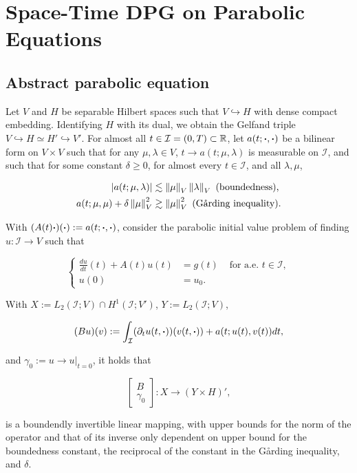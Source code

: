 \chapter{Space-Time DPG on Parabolic Equations}



\section{Abstract parabolic equation}

Let $V$ and $H$ be separable Hilbert spaces such that $V\hookrightarrow H$ with dense compact embedding. Identifying $H$ with its dual, we obtain the Gelfand triple $V\hookrightarrow H\simeq H'\hookrightarrow V'$. For almost all $t\in \mathcal{I}=(0,T)\subset\mathbb{R}$, let $a(t;\boldsymbol{\cdot},\boldsymbol{\cdot})$ be a bilinear form on $V\times V$ such that for any $\mu,\lambda\in V$, $t\rightarrow a(t;\mu,\lambda)$ is measurable on $\mathcal{I}$, and such that for some constant $\delta\geq0$, for almost every $t\in\mathcal{I}$, and all $\lambda,\mu$,

\begin{align*}
    |a(t;\mu,\lambda)|&\lesssim\left\lVert\mu \right\rVert_V\left\lVert\lambda \right\rVert_V \text{ (boundedness),}\\
    a(t;\mu,\mu)+\delta\left\lVert\mu \right\rVert_V^2&\gtrsim \left\lVert\mu \right\rVert_V^2 \text{ (Gårding inequality).}
\end{align*}

With $(A(t)\boldsymbol{\cdot})(\boldsymbol{\cdot}):=a(t;\boldsymbol{\cdot},\boldsymbol{\cdot})$, consider the parabolic initial value problem of finding $u:\mathcal{I}\to V$ such that

$$\left\{\begin{aligned}
    \frac{du}{dt}(t)+A(t)u(t)&=g(t)&\text{ for a.e. }t\in \mathcal{I},\\
    u(0)&=u_0.&
\end{aligned}\right.$$

\begin{teor}\label{garding}
    With $X:=L_2(\mathcal{I};V)\cap H^1(\mathcal{I};V')$, $Y:=L_2(\mathcal{I};V)$,

    $$(Bu)(v):=\int_{\mathcal{I}}(\partial_tu(t,\boldsymbol{\cdot}))(v(t,\boldsymbol{\cdot}))+a(t;u(t),v(t))dt,$$

    and $\gamma_0:=u\to u|_{t=0}$, it holds that

    $$\left[\begin{matrix}
        B\\\gamma_0
    \end{matrix}\right]:X\to(Y\times H)',$$

    is a boundendly invertible linear mapping, with upper bounds for the norm of the operator and that of its inverse only dependent on upper bound for the boundedness constant, the reciprocal of the constant in the Gårding inequality, and $\delta$.
\end{teor}

